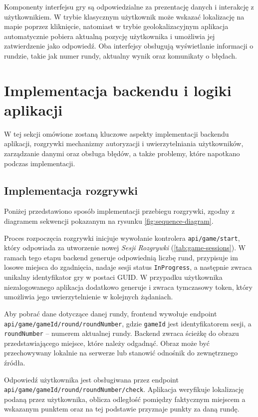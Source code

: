 Komponenty interfejsu gry są odpowiedzialne za prezentację danych i interakcję z użytkownikiem. W trybie klasycznym użytkownik może wskazać lokalizację na mapie poprzez kliknięcie, natomiast w trybie geolokalizacyjnym aplikacja automatycznie pobiera aktualną pozycję użytkownika i umożliwia jej zatwierdzenie jako odpowiedź. Oba interfejsy obsługują wyświetlanie informacji o rundzie, takie jak numer rundy, aktualny wynik oraz komunikaty o błędach.


\section{Implementacja backendu i logiki aplikacji}

W tej sekcji omówione zostaną kluczowe aspekty implementacji backendu aplikacji, rozgrywki  mechanizmy autoryzacji i uwierzytelniania użytkowników, zarządzanie danymi oraz obsługa błędów, a także problemy, które napotkano podczas implementacji.

\subsection{Implementacja rozgrywki}

Poniżej przedstawiono sposób implementacji przebiegu rozgrywki, zgodny z diagramem sekwencji pokazanym na rysunku \ref{fig:sequence-diagram}. 

Proces rozpoczęcia rozgrywki inicjuje wywołanie kontrolera \texttt{api/game/start}, który odpowiada za utworzenie nowej \textit{Sesji Rozgrywki} (\ref{tab:game-sessions}).
W ramach tego etapu backend generuje odpowiednią liczbę rund, przypisuje im losowe miejsca do zgadnięcia, nadaje sesji status \texttt{InProgress}, a następnie zwraca unikalny identyfikator gry w postaci GUID.
W przypadku użytkownika niezalogowanego aplikacja dodatkowo generuje i zwraca tymczasowy token, który umożliwia jego uwierzytelnienie w kolejnych żądaniach.

Aby pobrać dane dotyczące danej rundy, frontend wywołuje endpoint
\texttt{api/game/{gameId}/round/{roundNumber}},
gdzie \texttt{gameId} jest identyfikatorem sesji, a \texttt{roundNumber} – numerem aktualnej rundy. Backend zwraca ścieżkę do obrazu przedstawiającego miejsce, które należy odgadnąć. Obraz może być przechowywany lokalnie na serwerze lub stanowić odnośnik do zewnętrznego źródła.


Odpowiedź użytkownika jest obsługiwana przez endpoint
\texttt{api/game/{gameId}/round/{roundNumber}/check}.
Aplikacja weryfikuje lokalizację podaną przez użytkownika, oblicza odległość pomiędzy faktycznym miejscem a wskazanym punktem oraz na tej podstawie przyznaje punkty za daną rundę.

